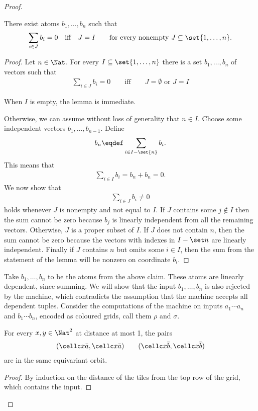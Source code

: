 \begin{proof}
\begin{claim}\label{lem:cheat} There exist atoms $b_1,\ldots,b_n$ such that
	\begin{align*}
		\sum_{i \in J} b_i = 0 \quad \mbox{iff} \quad J=I \qquad \text{for every nonempty $J \subseteq \set{1,\ldots,n}$.}
	\end{align*}
\end{claim}
\begin{proof}

	Let $n \in \Nat$.
	For every $I \subseteq \set{1,\ldots,n}$ there is a set $b_1,\ldots,b_n$ of vectors such that
\begin{align*}
	\sum_{i \in J} b_i = 0 \qquad \mbox{iff} \qquad J=\emptyset \mbox{ or }J=I
\end{align*}


	When $I$ is empty, the lemma is immediate. 
	
	
Otherwise,	we can assume without loss of generality that $n \in I$.	
	Choose some independent vectors $b_1,\ldots,b_{n-1}$. Define 
	\begin{align*}
		b_n \eqdef \sum_{i \in I-\set{n}} b_i.
	\end{align*}
	This means that 
	\begin{align*}
		\sum_{i \in I} b_i = b_n + b_n = 0.
	\end{align*}
	We now show that 
	\begin{align*}
		\sum_{i \in J} b_i \neq 0 
	\end{align*}
	holds whenever $J$ is nonempty and not equal to $I$.
	If $J$ contains some $j \not \in I$ then the sum cannot be zero because $b_j$ is linearly independent from all the remaining vectors. Otherwise, $J$ is a proper subset of $I$. If $J$ does not contain $n$, then the sum cannot be zero because the vectors with indexes in $I - \set n$ are linearly independent. Finally if $J$ contains $n$ but omits some $i \in I$, then the sum from the statement of the lemma will be nonzero on coordinate $b_i$.
\end{proof}

Take $b_1,\ldots,b_n$ to be the atoms from the above claim. These atoms are linearly dependent, since summing. We will show that the input $b_1,\ldots,b_n$ is also rejected by the machine, which contradicts the assumption that the machine accepts all dependent tuples. 
Consider the computations of the machine on inputs $a_1 \cdots a_n$ and $b_1 \cdots b_n$, encoded as coloured grids, call them $\rho$ and $\sigma$. 
\begin{claim}
	For every $x,y \in \Nat^2$ at distance at most 1, the pairs 
	\begin{align*}
		(\cellc x {\bar a}, \cellc x {\bar a}) \qquad (\cellc x {\bar b}, \cellc x {\bar b}) 		\end{align*}
	are in the same equivariant orbit.
\end{claim}
\begin{proof}
	By induction on the distance of the tiles from the top row of the grid, which contains the input.
\end{proof}


\end{proof}

